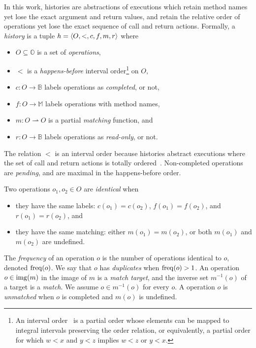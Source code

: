 In this work, histories are abstractions of executions which retain method
names yet lose the exact argument and return values, and retain the relative
order of operations yet lose the exact sequence of call and return actions.
Formally, a \emph{history} is a tuple $h = {\left\langle{O,<,c,f,m,r}\right\rangle}$ where
\begin{itemize}

  \item $O \subseteq \mathbb{O}$ is a set of \emph{operations},

  \item $<$ is a \emph{happens-before} interval order\footnote{An interval
  order~\cite{books/Fishburn85} is a partial order whose elements can be mapped
  to integral intervals preserving the order relation, or equivalently, a
  partial order for which $w < x$ and $y < z$ implies $w < z$ or $y < x$.} on
  $O$,

  \item $c: O \to \mathbb{B}$ labels operations as \emph{completed}, or not,

  \item $f: O \to \mathbb{M}$ labels operations with method names,

  \item $m: O \rightharpoonup O$ is a partial \emph{matching} function, and

  \item $r: O \to \mathbb{B}$ labels operations as \emph{read-only}, or not.

\end{itemize}
The relation $<$ is an interval order because histories abstract executions where
the set of call and return actions is totally ordered~\cite{conf/popl/BouajjaniEEH15}.
Non-completed operations are \emph{pending}, and are maximal in the
happens-before order. 

Two operations $o_1, o_2 \in O$ are \emph{identical} when
  \vspace{-1mm}
\begin{itemize}

  \item they have the same labels: $c(o_1) = c(o_2)$, $f(o_1)= f(o_2)$, and
  $r(o_1) = r(o_2)$, and

  \item they have the same matching: either $m(o_1) = m(o_2)$, or both $m(o_1)$
  and $m(o_2)$ are undefined.
  \vspace{-1mm}
\end{itemize} 
The \emph{frequency} of an operation $o$ is the number of operations identical
to $o$, denoted $\operatorname{freq}(o)$. We say that $o$ has \emph{duplicates} when
$\operatorname{freq}(o) > 1$. An operation $o \in \operatorname{img}(m)$ in the image of $m$ is a
\emph{match target}, and the inverse set $m^{-1}(o)$ of a target is a
\emph{match}. We assume $o \in m^{-1}(o)$ for every $o$. A operation $o$ is \emph{unmatched}
when $o$ is completed and $m(o)$ is undefined.

